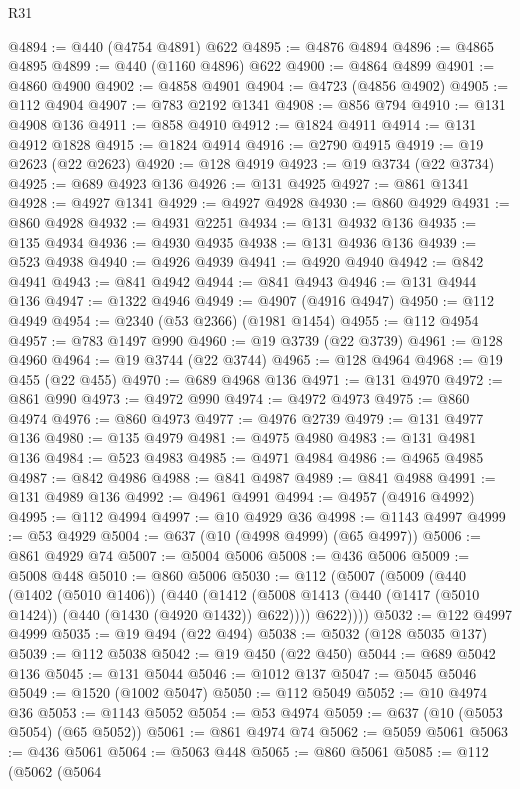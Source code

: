 \begin{lexlean}{R31}
\begin{coremodule}
@4894 := @440 (@4754 @4891) @622
@4895 := @4876 @4894
@4896 := @4865 @4895
@4899 := @440 (@1160 @4896) @622
@4900 := @4864 @4899
@4901 := @4860 @4900
@4902 := @4858 @4901
@4904 := @4723 (@4856 @4902)
@4905 := @112 @4904
@4907 := @783 @2192 @1341
@4908 := @856 @794
@4910 := @131 @4908 @136
@4911 := @858 @4910
@4912 := @1824 @4911
@4914 := @131 @4912 @1828
@4915 := @1824 @4914
@4916 := @2790 @4915
@4919 := @19 @2623 (@22 @2623)
@4920 := @128 @4919
@4923 := @19 @3734 (@22 @3734)
@4925 := @689 @4923 @136
@4926 := @131 @4925
@4927 := @861 @1341
@4928 := @4927 @1341
@4929 := @4927 @4928
@4930 := @860 @4929
@4931 := @860 @4928
@4932 := @4931 @2251
@4934 := @131 @4932 @136
@4935 := @135 @4934
@4936 := @4930 @4935
@4938 := @131 @4936 @136
@4939 := @523 @4938
@4940 := @4926 @4939
@4941 := @4920 @4940
@4942 := @842 @4941
@4943 := @841 @4942
@4944 := @841 @4943
@4946 := @131 @4944 @136
@4947 := @1322 @4946
@4949 := @4907 (@4916 @4947)
@4950 := @112 @4949
@4954 := @2340 (@53 @2366) (@1981 @1454)
@4955 := @112 @4954
@4957 := @783 @1497 @990
@4960 := @19 @3739 (@22 @3739)
@4961 := @128 @4960
@4964 := @19 @3744 (@22 @3744)
@4965 := @128 @4964
@4968 := @19 @455 (@22 @455)
@4970 := @689 @4968 @136
@4971 := @131 @4970
@4972 := @861 @990
@4973 := @4972 @990
@4974 := @4972 @4973
@4975 := @860 @4974
@4976 := @860 @4973
@4977 := @4976 @2739
@4979 := @131 @4977 @136
@4980 := @135 @4979
@4981 := @4975 @4980
@4983 := @131 @4981 @136
@4984 := @523 @4983
@4985 := @4971 @4984
@4986 := @4965 @4985
@4987 := @842 @4986
@4988 := @841 @4987
@4989 := @841 @4988
@4991 := @131 @4989 @136
@4992 := @4961 @4991
@4994 := @4957 (@4916 @4992)
@4995 := @112 @4994
@4997 := @10 @4929 @36
@4998 := @1143 @4997
@4999 := @53 @4929
@5004 := @637 (@10 (@4998 @4999) (@65 @4997))
@5006 := @861 @4929 @74
@5007 := @5004 @5006
@5008 := @436 @5006
@5009 := @5008 @448
@5010 := @860 @5006
@5030 := @112
    (@5007
      (@5009
        (@440
          (@1402 (@5010 @1406))
          (@440
            (@1412 (@5008 @1413 (@440 (@1417 (@5010 @1424)) (@440 (@1430 (@4920 @1432)) @622))))
            @622))))
@5032 := @122 @4997 @4999
@5035 := @19 @494 (@22 @494)
@5038 := @5032 (@128 @5035 @137)
@5039 := @112 @5038
@5042 := @19 @450 (@22 @450)
@5044 := @689 @5042 @136
@5045 := @131 @5044
@5046 := @1012 @137
@5047 := @5045 @5046
@5049 := @1520 (@1002 @5047)
@5050 := @112 @5049
@5052 := @10 @4974 @36
@5053 := @1143 @5052
@5054 := @53 @4974
@5059 := @637 (@10 (@5053 @5054) (@65 @5052))
@5061 := @861 @4974 @74
@5062 := @5059 @5061
@5063 := @436 @5061
@5064 := @5063 @448
@5065 := @860 @5061
@5085 := @112
    (@5062
      (@5064

\end{coremodule}
\end{lexlean}
